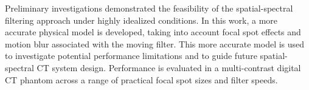 \documentclass[]{spie}  %
\begin{document}
Preliminary investigations \cite{stayman2018model} demonstrated the feasibility of the spatial-spectral filtering approach under highly idealized conditions. In this work, a more accurate physical model is developed, taking into account focal spot effects and motion blur associated with the moving filter. This more accurate model is used to investigate potential performance limitations and to guide future spatial-spectral CT system design. Performance is evaluated in a multi-contrast digital CT phantom across a range of practical focal spot sizes and filter speeds.




\end{document}
